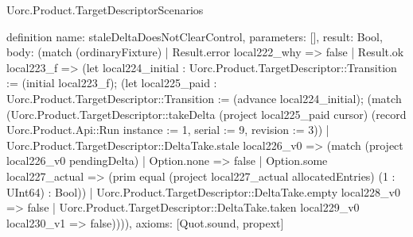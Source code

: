 \begin{lexlean}{Uorc.Product.TargetDescriptorScenarios}
\begin{semanticmodule}
definition{
  name: staleDeltaDoesNotClearControl,
  parameters: [],
  result: Bool,
  body: (match (ordinaryFixture)
    | Result.error local222_why => false
    | Result.ok local223_f => (let local224_initial : Uorc.Product.TargetDescriptor::Transition := (initial local223_f); (let local225_paid : Uorc.Product.TargetDescriptor::Transition := (advance local224_initial); (match (Uorc.Product.TargetDescriptor::takeDelta (project local225_paid cursor) (record Uorc.Product.Api::Run {instance := 1, serial := 9, revision := 3}))
      | Uorc.Product.TargetDescriptor::DeltaTake.stale local226_v0 => (match (project local226_v0 pendingDelta)
        | Option.none => false
        | Option.some local227_actual => (prim equal (project local227_actual allocatedEntries) (1 : UInt64) : Bool))
      | Uorc.Product.TargetDescriptor::DeltaTake.empty local228_v0 => false
      | Uorc.Product.TargetDescriptor::DeltaTake.taken local229_v0 local230_v1 => false)))),
  axioms: [Quot.sound, propext]
}


\end{semanticmodule}
\end{lexlean}
